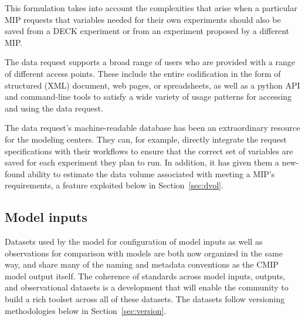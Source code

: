 \documentclass[gmd,manuscript]{copernicus}
\newcommand{\pllabel}[1]{\label{p-#1}\linelabel{l-#1}}
\begin{document}
This formulation takes into account the complexities that arise when a
particular MIP requests that variables needed for their own
experiments should also be saved from a DECK experiment or from an
experiment proposed by a different MIP.

The data request supports a broad range of users who are 
provided with a range of different access points. These include the
entire codification in the form of structured (XML) document, web
pages, or spreadsheets, as well as a python API and command-line tools
to satisfy a wide variety of usage patterns for accessing and using
the data request.


The data request's machine-readable database has been an extraordinary
resource for the modeling centers. They can, for example, directly
integrate the request specifications with their workflows to ensure
that the correct set of variables are saved for each experiment they
plan to run. In addition, it has given them a new-found ability to
estimate the data volume associated with meeting a MIP's requirements,
a feature exploited below in Section~\ref{sec:dvol}.

\subsection{Model inputs}
\label{sec:data-inputs}

Datasets used by the model for configuration of model inputs
\citep[\texttt{input4MIPs}, see][]{ref:duracketal2017} as well as
observations for comparison with models \citep[\texttt{obs4MIPs},
see][]{ref:teixeiraetal2014} are both now organized in the same way,
and share many of the naming and metadata conventions as the CMIP
model output itself.
\pllabel{RC3-9}
The coherence of standards across model inputs, outputs, and
observational datasets is a development that will enable the community
to build a rich toolset across all of these datasets. The datasets
follow versioning methodologies below in Section~\ref{sec:version}.
\end{document}
